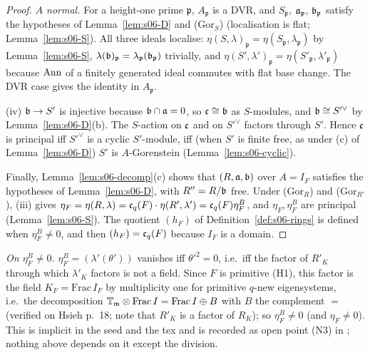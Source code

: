 \begin{proof}
\emph{$A$ normal.} For a height-one prime $\mathfrak p$, $A_{\mathfrak p}$ is a DVR, and $S_{\mathfrak p}$, $\mathfrak{a}_{\mathfrak p}$, $\mathfrak{b}_{\mathfrak p}$ satisfy the
hypotheses of Lemma~\ref{lem:s06-D} and (Gor$_S$) (localisation is flat; Lemma~\ref{lem:s06-S}). All three ideals localise:
$\eta(S,\lambda)_{\mathfrak p}=\eta(S_{\mathfrak p},\lambda_{\mathfrak p})$ by Lemma~\ref{lem:s06-S}, $\lambda(\mathfrak{b})_{\mathfrak p}=\lambda_{\mathfrak p}(\mathfrak{b}_{\mathfrak p})$
trivially, and $\eta(S',\lambda')_{\mathfrak p}=\eta(S'_{\mathfrak p},\lambda'_{\mathfrak p})$ because $\operatorname{Ann}$ of a finitely generated ideal commutes with
flat base change. The DVR case gives the identity in $A_{\mathfrak p}$.

(iv) $\mathfrak{b}\to S'$ is injective because $\mathfrak{b}\cap\mathfrak{a}=0$, so $\mathfrak{c}\cong\mathfrak{b}$ as $S$-modules, and $\mathfrak{b}\cong S'^\vee$ by Lemma~\ref{lem:s06-D}(b). The
$S$-action on $\mathfrak{c}$ and on $S'^\vee$ factors through $S'$. Hence $\mathfrak{c}$ is principal iff $S'^\vee$ is a cyclic $S'$-module, iff (when $S'$
is finite free, as under (c) of Lemma~\ref{lem:s06-D}) $S'$ is $A$-Gorenstein (Lemma~\ref{lem:s06-cyclic}).

Finally, Lemma~\ref{lem:s06-decomp}(c) shows that $(R,\mathfrak{a},\mathfrak{b})$ over $A=I_F$ satisfies the hypotheses of Lemma~\ref{lem:s06-D}, with
$R''=R/\mathfrak{b}$ free. Under (Gor$_R$) and (Gor$_{R'}$), (iii) gives $\eta_F=\eta(R,\lambda)=\mathfrak{c}_q(F)\cdot\eta(R',\lambda')=\mathfrak{c}_q(F)\eta^B_F$, and
$\eta_F,\eta^B_F$ are principal (Lemma~\ref{lem:s06-S}). The quotient $(h_F)$ of Definition~\ref{def:s06-rings} is defined when
$\eta^B_F\ne0$, and then $(h_F)=\mathfrak{c}_q(F)$ because $I_F$ is a domain.
\end{proof}
\noindent\emph{On $\eta^B_F\ne0$.} $\eta^B_F=(\lambda'(\theta'))$ vanishes iff $\theta'^2=0$, i.e.\ iff the factor of $R'_K$ through which
$\lambda'_K$ factors is not a field. Since $F$ is primitive (H1), this factor is the field $K_F=\mathrm{Frac}\,I_F$ by multiplicity one
for primitive $q$-new eigensystems, i.e.\ the decomposition $\mathbb{T}_{\mathfrak{m}}\otimes\mathrm{Frac}\,I=\mathrm{Frac}\,I\oplus B$ with $B$ the complement \stcited{} \cite[(3.1), p.~18]{Hs} $=$ \cite[Cor.~3.7]{Hi88b} (verified on Hsieh p.~18; note that $R'_K$ is a factor of $R_K$); so $\eta^B_F\ne0$ (and $\eta_F\ne0$). This is implicit in the seed and the tex and is recorded as
open point (N3) in ; nothing above depends on it except the division.

